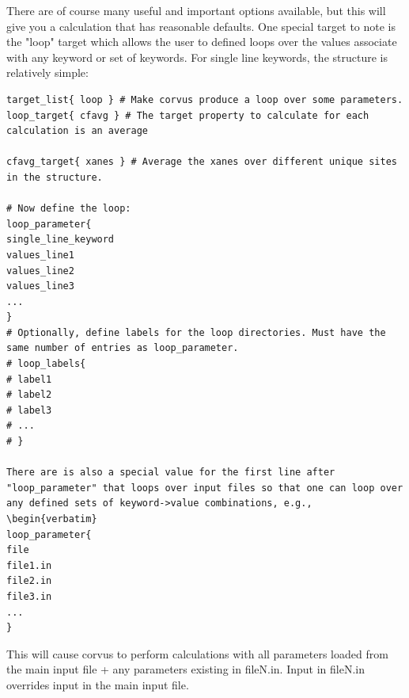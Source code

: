 There are of course many useful and important options available, but this will give you a calculation that has reasonable defaults.
One special target to note is the "loop" target which allows the user to defined loops over the values associate with any keyword or set 
of keywords. For single line keywords, the structure is relatively simple:
\begin{verbatim}
target_list{ loop } # Make corvus produce a loop over some parameters.
loop_target{ cfavg } # The target property to calculate for each calculation is an average

cfavg_target{ xanes } # Average the xanes over different unique sites in the structure.

# Now define the loop:
loop_parameter{
single_line_keyword
values_line1
values_line2
values_line3
...
}
# Optionally, define labels for the loop directories. Must have the same number of entries as loop_parameter.
# loop_labels{
# label1
# label2
# label3
# ...
# }

There are is also a special value for the first line after "loop_parameter" that loops over input files so that one can loop over 
any defined sets of keyword->value combinations, e.g., 
\begin{verbatim}
loop_parameter{
file
file1.in
file2.in
file3.in
...
}
\end{verbatim}
This will cause corvus to perform calculations with all parameters loaded from the main input file + any parameters existing in fileN.in. Input in fileN.in overrides input in the 
main input file.
